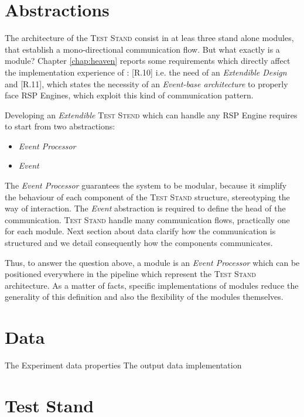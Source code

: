 
\section{Abstractions}

The architecture of the \textsc{Test Stand} consist in at leas three stand alone modules, that establish a mono-directional communication flow. But what exactly is a module? Chapter \ref{chap:heaven} reports some requirements which directly affect the implementation experience of \namens : [R.10] i.e. the need of an \textit{Extendible Design} and [R.11], which states the necessity of an \textit{Event-base architecture} to properly face RSP Engines, which exploit this kind of communication pattern.

Developing an \textit{Extendible} \textsc{Test Stend} which can handle any RSP Engine requires to start from two abstractions:
\begin{itemize}
\item \textit{Event Processor}
\item \textit{Event}
\end{itemize} 

The \textit{Event Processor} guarantees the system to be modular, because it simplify the behaviour of each component of the \textsc{Test Stand} structure, stereotyping the way of interaction. The \textit{Event} abstraction is required to define the head of the communication. \textsc{Test Stand} handle many communication flows, practically one for each module. Next section about data clarify how the communication is structured and we detail consequently how the components communicates.

Thus, to answer the question above, a module is an \textit{Event Processor} which can be positioned everywhere in the pipeline which represent the \textsc{Test Stand} architecture. 
As a matter of facts, specific implementations of modules reduce the generality of this definition and also the flexibility of the modules themselves.	

\section{Data}\label{sec:data-impl}

The Experiment data properties
The output data implementation

\section{Test Stand}\label{sec:teststand}

